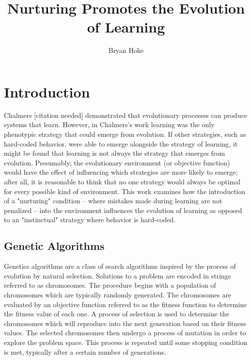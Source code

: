 \documentclass[master]{outhesis}
\title{Nurturing Promotes the Evolution of Learning}
\author{Bryan Hoke}
\begin{document}
\makefrontmatter

\chapter{Introduction}

Chalmers [citation needed] demonstrated that evolutionary processes can produce systems that learn.
However, in Chalmers's work learning was the only phenotypic strategy that could emerge from evolution.
If other strategies, such as hard-coded behavior, were able to emerge alongside the strategy of learning, it might be found that learning is not always the strategy that emerges from evolution.
Presumably, the evolutionary environment (or objective function) would have the effect of influencing which strategies are more likely to emerge; after all, it is reasonable to think that no one strategy would always be optimal for every possible kind of environment.
This work examines how the introduction of a "nurturing" condition -- where mistakes made during learning are not penalized -- into the environment influences the evolution of learning as opposed to an "instinctual" strategy where behavior is hard-coded.

\section{Genetic Algorithms}





Genetics algorithms are a class of search algorithms inspired by the process of evolution by natural selection.
Solutions to a problem are encoded in strings referred to as chromosomes.
The procedure begins with a population of chromosomes which are typically randomly generated.
The chromosomes are evaluated by an objective function referred to as the fitness function to determine the fitness value of each one.
A process of selection is used to determine the chromosomes which will reproduce into the next generation based on their fitness values.
The selected chromosomes then undergo a process of mutation in order to explore the problem space.
This process is repeated until some stopping condition is met, typically after a certain number of generations.
\end{document}
